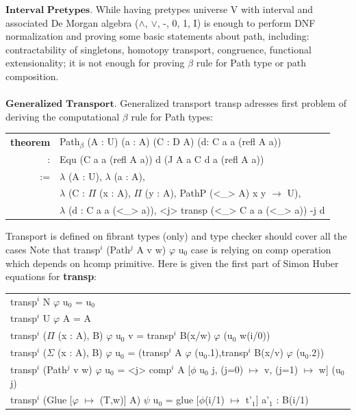 \documentclass[a4paper,UKenglish,cleveref, autoref, thm-restate]{lipics-v2021}
\newcommand{\tabstyle}[0]{\scriptsize\ttfamily\fontseries{l}\selectfont}
\begin{document}
$\textbf{Interval\ Pretypes}$. While having pretypes universe V with interval and
associated De Morgan algebra ($\wedge$, $\vee$, -, 0, 1, I) is enough to
perform DNF normalization and proving some basic statements about path, including:
contractability of singletons, homotopy transport, congruence, functional
extensionality; it is not enough for proving $\beta$ rule for Path type or path composition.
\\
\\
\indent $\textbf{Generalized\ Transport}$. Generalized transport transp adresses
first problem of deriving the computational $\beta$ rule for Path types:

\begin{table}[ht!]
\tabstyle
\begin{tabular}{rl}
\textbf{theorem} & Path$_\beta$ (A : U) (a : A) (C : D A) (d: C a a (refl A a)) \\
               : & Equ (C a a (refl A a)) d (J A a C d a (refl A a)) \\
              := & $\lambda$ (A : U), $\lambda$ (a : A), \\
                 & $\lambda$ (C : $\Pi$ (x : A), $\Pi$ (y : A), PathP (<\_> A) x y $\rightarrow$ U), \\
                 & $\lambda$ (d : C a a (<\_> a)), <j> transp (<\_> C a a (<\_> a)) -j d \\
\end{tabular}
\end{table}

Transport is defined on fibrant types (only) and type checker should cover all the cases
Note that transp$^i$ (Path$^j$ A v w) $\varphi$ u$_0$ case is relying on comp
operation which depends on hcomp primitive. Here is given the first part of Simon Huber equations \cite{Huber} for \textbf{transp}:

\begin{table}[ht!]
\tabstyle
\begin{tabular}{l}
transp$^{i}$ N $\varphi$ u$_0$ = u$_0$ \\
transp$^{i}$ U $\varphi$ A = A \\
transp$^{i}$ ($\Pi$ (x : A), B) $\varphi$ u$_0$ v = transp$^i$ B(x/w) $\varphi$ (u$_0$ w(i/0)) \\
transp$^{i}$ ($\Sigma$ (x : A), B) $\varphi$ u$_0$ = (transp$^i$ A $\varphi$ (u$_0$.1),transp$^i$ B(x/v) $\varphi$ (u$_0$.2)) \\
transp$^{i}$ (Path$^j$ v w) $\varphi$ u$_0$ = <j> comp$^i$ A [$\phi$ u$_0$ j, (j=0) $\mapsto$ v, (j=1) $\mapsto$ w] (u$_0$ j) \\
transp$^{i}$ (Glue [$\varphi$ $\mapsto$ (T,w)] A) $\psi$ u$_0$ = glue [$\phi$(i/1) $\mapsto$ t'$_1$] a'$_1$ : B(i/1) \\
\end{tabular}
\end{table}
\end{document}
